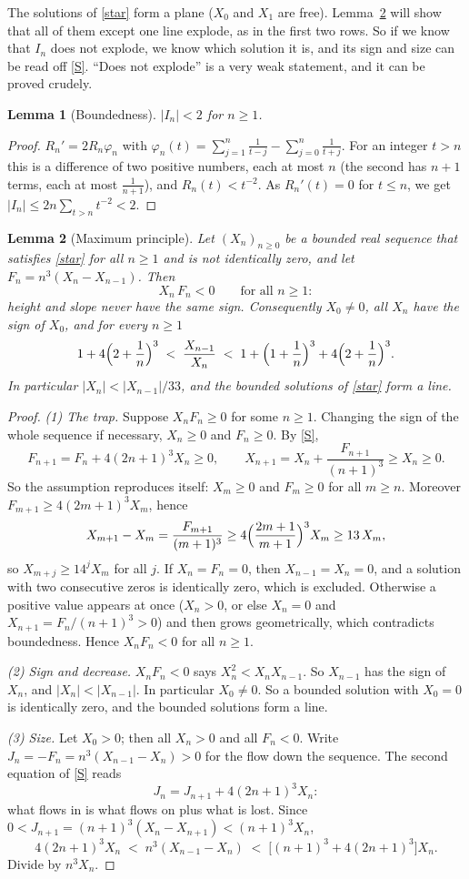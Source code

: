 \documentclass[11pt]{article}
\newtheorem{lemma}{Lemma}
\begin{document}
The solutions of \eqref{star} form a plane ($X_0$ and $X_1$ are free). Lemma~\ref{lem:max} will
show that all of them except one line explode, as in the first two rows. So if we know that $I_n$
does not explode, we know which solution it is, and its sign and size can be read off \eqref{S}.
``Does not explode'' is a very weak statement, and it can be proved crudely.

\begin{lemma}[Boundedness]\label{lem:bdd}
$|I_n|<2$ for $n\ge1$.
\end{lemma}
\begin{proof}
$R_n'=2R_n\varphi_n$ with $\varphi_n(t)=\sum_{j=1}^n\frac1{t-j}-\sum_{j=0}^n\frac1{t+j}$. For an
integer $t>n$ this is a difference of two positive numbers, each at most $n$ (the second has $n+1$
terms, each at most $\frac1{n+1}$), and $R_n(t)<t^{-2}$.
As $R_n'(t)=0$ for $t\le n$, we get $|I_n|\le2n\sum_{t>n}t^{-2}<2$.
\end{proof}

\begin{lemma}[Maximum principle]\label{lem:max}
Let $(X_n)_{n\ge0}$ be a bounded real sequence that satisfies \eqref{star} for all $n\ge1$ and is
not identically zero, and let $F_n=n^3(X_n-X_{n-1})$. Then
\[
X_n\,F_n<0\qquad\text{for all }n\ge1:
\]
height and slope never have the same sign. Consequently $X_0\ne0$, all $X_n$ have the sign of
$X_0$, and for every $n\ge1$
\[
1+4\Bigl(2+\frac1n\Bigr)^3\;<\;\frac{X_{n-1}}{X_n}\;<\;1+\Bigl(1+\frac1n\Bigr)^3+4\Bigl(2+\frac1n\Bigr)^3 .
\]
In particular $|X_n|<|X_{n-1}|/33$, and the bounded solutions of \eqref{star} form a line.
\end{lemma}
\begin{proof}
\emph{(1) The trap.} Suppose $X_nF_n\ge0$ for some $n\ge1$. Changing the sign of the whole sequence
if necessary, $X_n\ge0$ and $F_n\ge0$. By \eqref{S},
\[
F_{n+1}=F_n+4(2n+1)^3X_n\ge0,\qquad X_{n+1}=X_n+\frac{F_{n+1}}{(n+1)^3}\ge X_n\ge0 .
\]
So the assumption reproduces itself: $X_m\ge0$ and $F_m\ge0$ for all $m\ge n$. Moreover
$F_{m+1}\ge4(2m+1)^3X_m$, hence
\[
X_{m+1}-X_m=\frac{F_{m+1}}{(m+1)^3}\ge4\Bigl(\frac{2m+1}{m+1}\Bigr)^3X_m\ge13\,X_m ,
\]
so $X_{m+j}\ge14^jX_m$ for all $j$. If $X_n=F_n=0$, then $X_{n-1}=X_n=0$, and a solution with two
consecutive zeros is identically zero, which is excluded. Otherwise a positive value appears at
once ($X_n>0$, or else $X_n=0$ and $X_{n+1}=F_n/(n+1)^3>0$) and then grows geometrically, which
contradicts boundedness. Hence $X_nF_n<0$ for all $n\ge1$.

\emph{(2) Sign and decrease.} $X_nF_n<0$ says $X_n^2<X_nX_{n-1}$. So $X_{n-1}$ has the sign of
$X_n$, and $|X_n|<|X_{n-1}|$. In particular $X_0\ne0$. So a bounded solution with $X_0=0$ is
identically zero, and the bounded solutions form a line.

\emph{(3) Size.} Let $X_0>0$; then all $X_n>0$ and all $F_n<0$. Write $J_n=-F_n=n^3(X_{n-1}-X_n)>0$
for the flow down the sequence. The second equation of \eqref{S} reads
\[
J_n=J_{n+1}+4(2n+1)^3X_n:
\]
what flows in is what flows on plus what is lost. Since $0<J_{n+1}=(n+1)^3(X_n-X_{n+1})<(n+1)^3X_n$,
\[
4(2n+1)^3X_n\;<\;n^3(X_{n-1}-X_n)\;<\;\bigl[(n+1)^3+4(2n+1)^3\bigr]X_n .
\]
Divide by $n^3X_n$.
\end{proof}
\end{document}
